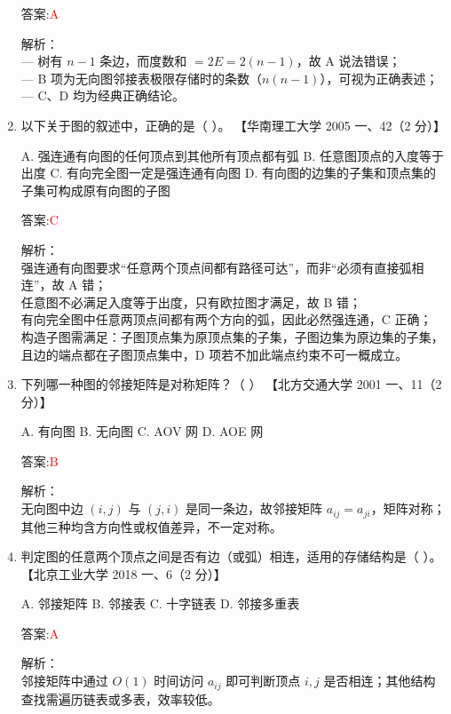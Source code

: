 \documentclass[lang=cn,newtx,10pt,scheme=chinese]{../../../elegantbook}
\begin{document}
\begin{enumerate}
    答案:\textcolor{red}{A}

    解析：\\
    — 树有 $n-1$ 条边，而度数和 $=2E=2(n-1)$，故 A 说法错误；\\
    — B 项为无向图邻接表极限存储时的条数（$n(n-1)$），可视为正确表述；\\
    — C、D 均为经典正确结论。\\

    
    \item 以下关于图的叙述中，正确的是（ ）。  
    【华南理工大学 2005 一、42（2 分）】

    A. 强连通有向图的任何顶点到其他所有顶点都有弧  
    B. 任意图顶点的入度等于出度  
    C. 有向完全图一定是强连通有向图  
    D. 有向图的边集的子集和顶点集的子集可构成原有向图的子图  

    答案:\textcolor{red}{C}

    解析：\\
    强连通有向图要求“任意两个顶点间都有路径可达”，而非“必须有直接弧相连”，故 A 错；\\
    任意图不必满足入度等于出度，只有欧拉图才满足，故 B 错；\\
    有向完全图中任意两顶点间都有两个方向的弧，因此必然强连通，C 正确；\\
    构造子图需满足：子图顶点集为原顶点集的子集，子图边集为原边集的子集，且边的端点都在子图顶点集中，D 项若不加此端点约束不可一概成立。\\

\item 下列哪一种图的邻接矩阵是对称矩阵？（  ）  
    【北方交通大学 2001 一、11（2 分）】

    A. 有向图  
    B. 无向图  
    C. AOV 网  
    D. AOE 网  

    答案:\textcolor{red}{B}

    解析：\\
    无向图中边 $(i,j)$ 与 $(j,i)$ 是同一条边，故邻接矩阵 $a_{ij}=a_{ji}$，矩阵对称；其他三种均含方向性或权值差异，不一定对称。\\

\item 判定图的任意两个顶点之间是否有边（或弧）相连，适用的存储结构是（ ）。  
    【北京工业大学 2018 一、6（2 分）】

    A. 邻接矩阵  
    B. 邻接表  
    C. 十字链表  
    D. 邻接多重表  

    答案:\textcolor{red}{A}

    解析：\\
    邻接矩阵中通过 $O(1)$ 时间访问 $a_{ij}$ 即可判断顶点 $i,j$ 是否相连；其他结构查找需遍历链表或多表，效率较低。\\


\end{enumerate}
\end{document}

